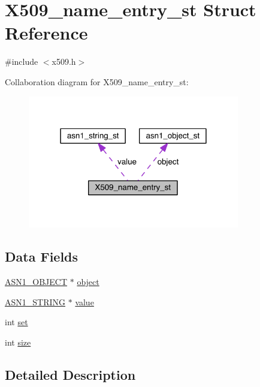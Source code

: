 \hypertarget{struct_x509__name__entry__st}{}\section{X509\+\_\+name\+\_\+entry\+\_\+st Struct Reference}
\label{struct_x509__name__entry__st}


{\ttfamily \#include $<$x509.\+h$>$}



Collaboration diagram for X509\+\_\+name\+\_\+entry\+\_\+st\+:\nopagebreak
\begin{figure}[H]
\begin{center}
\leavevmode
\includegraphics[width=262pt]{struct_x509__name__entry__st__coll__graph}
\end{center}
\end{figure}
\subsection*{Data Fields}
\begin{DoxyCompactItemize}
\item 
\hyperlink{crypto_2ossl__typ_8h_ae3fda0801e4c8e250087052bafb3ce2e}{A\+S\+N1\+\_\+\+O\+B\+J\+E\+CT} $\ast$ \hyperlink{struct_x509__name__entry__st_aac268aa1904733da5af63d97def610c4}{object}
\item 
\hyperlink{crypto_2ossl__typ_8h_ad37610875e38aa6c59f5e6e0b437e65c}{A\+S\+N1\+\_\+\+S\+T\+R\+I\+NG} $\ast$ \hyperlink{struct_x509__name__entry__st_a2d01db82068d723c43e919ae384a61f5}{value}
\item 
int \hyperlink{struct_x509__name__entry__st_abc95fb2bad5b94ceca590f7dacd269b5}{set}
\item 
int \hyperlink{struct_x509__name__entry__st_a439227feff9d7f55384e8780cfc2eb82}{size}
\end{DoxyCompactItemize}


\subsection{Detailed Description}



